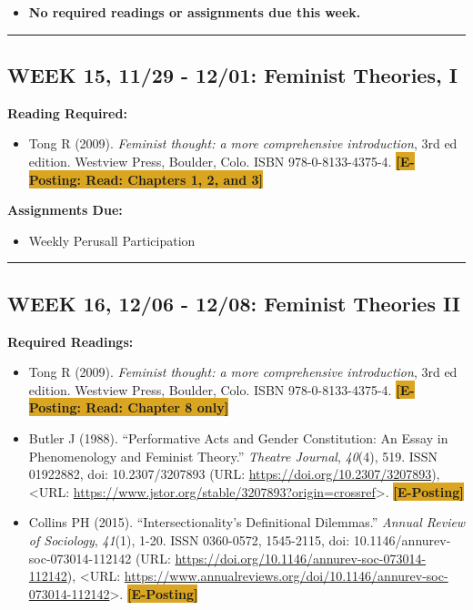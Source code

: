 \documentclass[11pt,]{article}
\providecommand{\tightlist}{%
  \setlength{\itemsep}{0pt}\setlength{\parskip}{0pt}}
\begin{document}
\begin{itemize}
\tightlist
\item
  \textcolor{BurntOrange}{\bf{No required readings or assignments due this week.}}
\end{itemize}

\bigbreak
\hrule

\hypertarget{week-15-1129---1201-feminist-theories-i}{%
\subsection{WEEK 15, 11/29 - 12/01: Feminist Theories,
I}\label{week-15-1129---1201-feminist-theories-i}}

\textbf{Reading Required:}

\begin{itemize}
\tightlist
\item
  Tong R (2009). \emph{Feminist thought: a more comprehensive
  introduction}, 3rd ed edition. Westview Press, Boulder, Colo. ISBN
  978-0-8133-4375-4.
  \colorbox{Goldenrod}{\bf{[E-Posting: Read: Chapters 1, 2, and 3]}}
\end{itemize}

\textbf{Assignments Due:}

\begin{itemize}
\tightlist
\item
  Weekly Perusall Participation
\end{itemize}

\bigbreak
\hrule

\hypertarget{week-16-1206---1208-feminist-theories-ii}{%
\subsection{WEEK 16, 12/06 - 12/08: Feminist Theories
II}\label{week-16-1206---1208-feminist-theories-ii}}

\textbf{Required Readings:}

\begin{itemize}
\item
  Tong R (2009). \emph{Feminist thought: a more comprehensive
  introduction}, 3rd ed edition. Westview Press, Boulder, Colo. ISBN
  978-0-8133-4375-4.
  \colorbox{Goldenrod}{\bf{[E-Posting: Read: Chapter 8 only]}}
\item
  Butler J (1988). ``Performative Acts and Gender Constitution: An Essay
  in Phenomenology and Feminist Theory.'' \emph{Theatre Journal},
  \emph{40}(4), 519. ISSN 01922882, doi: 10.2307/3207893 (URL:
  \url{https://doi.org/10.2307/3207893}), \textless URL:
  \url{https://www.jstor.org/stable/3207893?origin=crossref}\textgreater.
  \colorbox{Goldenrod}{\bf{[E-Posting]}}
\item
  Collins PH (2015). ``Intersectionality's Definitional Dilemmas.''
  \emph{Annual Review of Sociology}, \emph{41}(1), 1-20. ISSN 0360-0572,
  1545-2115, doi: 10.1146/annurev-soc-073014-112142 (URL:
  \url{https://doi.org/10.1146/annurev-soc-073014-112142}),
  \textless URL:
  \url{https://www.annualreviews.org/doi/10.1146/annurev-soc-073014-112142}\textgreater.
  \colorbox{Goldenrod}{\bf{[E-Posting]}}
\end{itemize}
\end{document}
